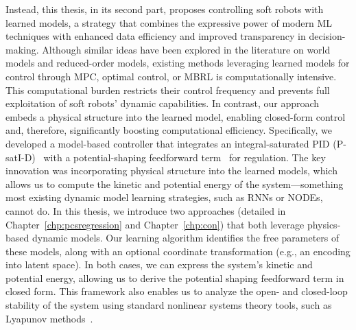 Instead, this thesis, in its second part, proposes controlling soft robots with learned models, a strategy that combines the expressive power of modern \gls{ML} techniques with enhanced data efficiency and improved transparency in decision-making. Although similar ideas have been explored in the literature on world models and reduced-order models, existing methods leveraging learned models for control through \gls{MPC}, optimal control, or \gls{MBRL} is computationally intensive. This computational burden restricts their control frequency and prevents full exploitation of soft robots’ dynamic capabilities. In contrast, our approach embeds a physical structure into the learned model, enabling closed-form control and, therefore, significantly boosting computational efficiency. Specifically, we developed a model-based controller that integrates an integral-saturated PID (P-satI-D)~\citep{pustina2022p} with a potential-shaping feedforward term~\citep{della2023model} for regulation. The key innovation was incorporating physical structure into the learned models, which allows us to compute the kinetic and potential energy of the system—something most existing dynamic model learning strategies, such as \glspl{RNN} or \glspl{NODE}, cannot do. In this thesis, we introduce two approaches (detailed in Chapter~\ref{chp:pcsregression} and Chapter~\ref{chp:con}) that both leverage physics-based dynamic models. Our learning algorithm identifies the free parameters of these models, along with an optional coordinate transformation (e.g., an encoding into latent space). In both cases, we can express the system’s kinetic and potential energy, allowing us to derive the potential shaping feedforward term in closed form. This framework also enables us to analyze the open- and closed-loop stability of the system using standard nonlinear systems theory tools, such as Lyapunov methods~\citep{khalil2002nonlinear}.

